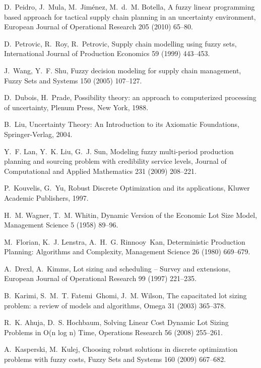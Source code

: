 \documentclass[11pt]{article}
\begin{document}
\begin{thebibliography}{10}
D.~Peidro, J.~Mula, M.~Jim{\'e}nez, M.~d.~M. Botella, A fuzzy linear
  programming based approach for tactical supply chain planning in an
  uncertainty environment, European Journal of Operational Research 205 (2010)
  65--80.

D.~Petrovic, R.~Roy, R.~Petrovic, Supply chain modelling using fuzzy sets,
  International Journal of Production Economics 59 (1999) 443--453.

J.~Wang, Y.~F. Shu, Fuzzy decision modeling for supply chain management, Fuzzy
  Sets and Systems 150 (2005) 107--127.

D.~Dubois, H.~Prade, Possibility theory: an approach to computerized processing
  of uncertainty, Plenum Press, New York, 1988.

B.~Liu, Uncertainty {T}heory: An {I}ntroduction to its {A}xiomatic
  {F}oundations, Springer-Verlag, 2004.

Y.~F. Lan, Y.~K. Liu, G.~J. Sun, Modeling fuzzy multi-period production
  planning and sourcing problem with credibility service levels, Journal of
  Computational and Applied Mathematics 231 (2009) 208--221.

P.~Kouvelis, G.~Yu, Robust Discrete Optimization and its applications, Kluwer
  Academic Publishers, 1997.

H.~M. Wagner, T.~M. Whitin, {D}ynamic {V}ersion of the {E}conomic {L}ot {S}ize
  {M}odel, Management Science 5 (1958) 89--96.

M.~Florian, K.~J. Lenstra, A.~H.~G. Rinnooy~Kan, {D}eterministic {P}roduction
  {P}lanning: {A}lgorithms and {C}omplexity, Management Science 26 (1980)
  669--679.

A.~Drexl, A.~Kimms, Lot sizing and scheduling -- {S}urvey and extensions,
  European Journal of Operational Research 99 (1997) 221--235.

B.~Karimi, S.~M.~T. Fatemi~Ghomi, J.~M. Wilson, The capacitated lot sizing
  problem: a review of models and algorithms, Omega 31 (2003) 365--378.

R.~K. Ahuja, D.~S. Hochbaum, {S}olving {L}inear {C}ost {D}ynamic {L}ot {S}izing
  {P}roblems in {O}(n log n) {T}ime, Operations Research 56 (2008) 255--261.

A.~Kasperski, M.~Kulej, Choosing robust solutions in discrete optimization
  problems with fuzzy costs, Fuzzy Sets and Systems 160 (2009) 667--682.


\end{thebibliography}
\end{document}

